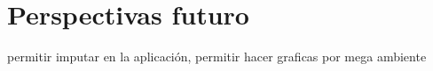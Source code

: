 \chapter*{Perspectivas futuro}

permitir imputar en la aplicación, permitir hacer graficas por mega ambiente

